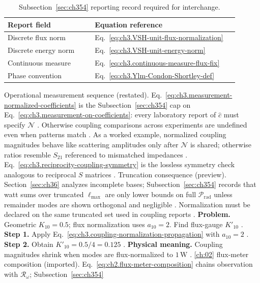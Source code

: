 \begin{table}[t]
\centering
\caption{Subsection~\ref{sec:ch354} reporting record required for interchange.}
\label{tab:ch3.354-metadata-contract}
\small
\begin{tabular}{@{}p{0.34\linewidth}p{0.56\linewidth}@{}}
\toprule
Report field & Equation reference \\
\midrule
Discrete flux norm & Eq.~\eqref{eq:ch3.VSH-unit-flux-normalization} \\
Discrete energy norm & Eq.~\eqref{eq:ch3.VSH-unit-energy-norm} \\
Continuous measure & Eq.~\eqref{eq:ch3.continuous-measure-flux-fix} \\
Phase convention & Eq.~\eqref{eq:ch3.Ylm-Condon-Shortley-def} \\
\bottomrule
\end{tabular}
\end{table}
Operational measurement sequence (restated). Eq.~\eqref{eq:ch3.measurement-normalized-coefficients} is the Subsection~\ref{sec:ch354} cap on
Eq.~\eqref{eq:ch3.measurement-on-coefficients}: every laboratory report of \(\widehat{c}\) must specify \(\mathcal{N}\)
\cite{harrington2001}. Otherwise coupling comparisons across experiments are undefined even when patterns match
\cite{hansen1988}.
As a worked example, normalized coupling magnitudes behave like scattering amplitudes only after \(\mathcal{N}\) is shared; otherwise ratios
resemble \(S_{21}\) referenced to mismatched impedances \cite{harrington2001}. Eq.~\eqref{eq:ch3.reciprocity-coupling-symmetry}
is the lossless symmetry check analogous to reciprocal \(S\) matrices \cite{stratton1941}.
Truncation consequence (preview). Section~\ref{sec:ch36} analyzes incomplete bases; Subsection~\ref{sec:ch354} records that watt sums over truncated
\(\ell_{\max}\) are only lower bounds on full \(\mathcal{P}_{\mathrm{rad}}\) unless remainder modes are shown orthogonal
and negligible \cite{harrington2001}. Normalization must be declared on the same truncated set used
in coupling reports \cite{harrington2001}.
\textbf{Problem.} Geometric \(K_{10}=0.5\); flux normalization uses \(a_{10}=2\). Find flux-gauge \(K'_{10}\)
\cite{harrington2001}.
\textbf{Step 1.} Apply Eq.~\eqref{eq:ch3.coupling-normalization-propagation} with \(a_{10}=2\) \cite{hansen1988}.
\textbf{Step 2.} Obtain \(K'_{10}=0.5/4=0.125\) \cite{harrington2001}.
\textbf{Physical meaning.} Coupling magnitudes shrink when modes are flux-normalized to \(1\,\mathrm{W}\) \cite{stratton1941}.
\ref{ch:02} flux-meter composition (imported). Eq.~\eqref{eq:ch2.flux-meter-composition} chains observation with \(\mathcal{R}_\omega\); Subsection~\ref{sec:ch354}
